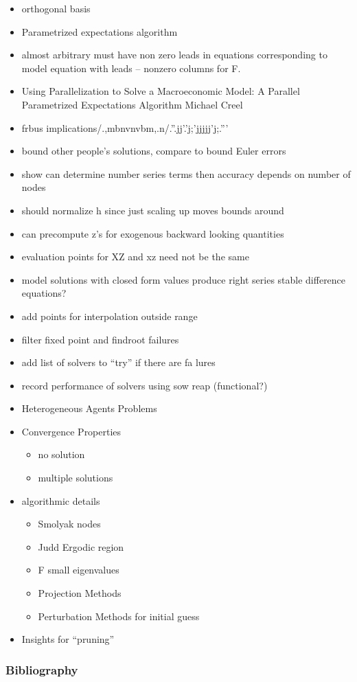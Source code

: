 \documentclass[tikz]{beamer}
\begin{document}
\begin{frame}
\begin{itemize}
  \item orthogonal basis
  \item Parametrized expectations algorithm
  \item almost arbitrary must have non zero leads in equations corresponding to model equation with leads -- nonzero columns for F.
  \item Using Parallelization to Solve a Macroeconomic Model: A Parallel Parametrized Expectations Algorithm
Michael Creel
  \item frbus implications/.,mbnvnvbm,.n/.''.jj'.'j;'jjjjj'j;.'''
  \item bound other people's solutions, compare to bound Euler errors
  \item show can determine number series terms then accuracy depends on number of nodes
  \item should normalize h since just scaling up moves bounds around
  \item can precompute z's for exogenous backward looking quantities
  \item evaluation points for XZ and xz need not be the same
  \item model solutions with closed form values produce right series stable difference equations?
  \item add points for interpolation outside range
  \item filter fixed point and findroot failures
  \item add list of solvers to ``try'' if there are fa lures
  \item record performance of solvers using sow reap (functional?)
  \item Heterogeneous Agents Problems
  \item Convergence Properties
    \begin{itemize}
    \item no solution
    \item multiple solutions
    \end{itemize}
\item algorithmic details
  \begin{itemize}
 \item Smolyak nodes
 \item Judd Ergodic region
 \item F small eigenvalues
 \item Projection Methods
 \item Perturbation Methods for initial guess
  \end{itemize}
\item Insights for ``pruning''
  \end{itemize}
\end{frame}

\begin{frame}
  \frametitle{Bibliography}
  


\end{frame}

\appendix
\end{document}
